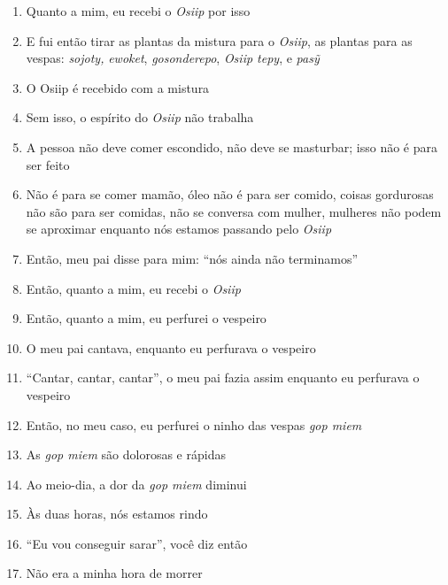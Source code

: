 \begin{enumerate}
 \begin{center}\end{center}
 
 \item Quanto a mim, eu recebi o \textit{Osiip} por isso
 \item E fui então tirar as plantas da mistura para o \textit{Osiip}, as
 plantas para as vespas: \textit{sojoty,} \textit{ewoket},
 \textit{gosonderepo}, \textit{Osiip tepy}, e \textit{pasỹ}
 \item O Osiip é recebido com a mistura
 \item Sem isso, o espírito do \textit{Osiip} não trabalha
 
 \begin{center}\end{center}
 
 \item A pessoa não deve comer escondido, não deve se masturbar; isso não é
 para ser feito
 \item Não é para se comer mamão, óleo não é para ser comido, coisas
 gordurosas não são para ser comidas, não se conversa com mulher,
 mulheres não podem se aproximar enquanto nós estamos passando pelo
 \textit{Osiip}
 
 \begin{center}\end{center}
 
 \item Então, meu pai disse para mim: ``nós ainda não terminamos''
 \item Então, quanto a mim, eu recebi o \textit{Osiip}
 \item Então, quanto a mim, eu perfurei o vespeiro
 \item O meu pai cantava, enquanto eu perfurava o vespeiro
 \item ``Cantar, cantar, cantar'', o meu pai fazia assim enquanto eu perfurava o vespeiro
 
 \begin{center}\end{center}
 
 \item Então, no meu caso, eu perfurei o ninho das vespas \textit{gop miem}
 \item As \textit{gop miem} são dolorosas e rápidas
 \item Ao meio-dia, a dor da \textit{gop miem} diminui
 \item Às duas horas, nós estamos rindo
 \item ``Eu vou conseguir sarar'', você diz então
 \item Não era a minha hora de morrer
 

\end{enumerate}
